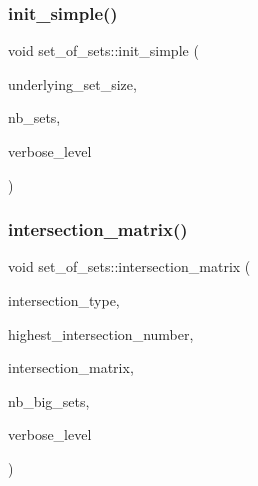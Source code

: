 \mbox{\label{classset__of__sets_a0c90576a42f3cf82abb307fa8dd97162}} 
\subsubsection{\texorpdfstring{init\+\_\+simple()}{init\_simple()}}
{\footnotesize\ttfamily void set\+\_\+of\+\_\+sets\+::init\+\_\+simple (\begin{DoxyParamCaption}\item[{\mbox{\hyperlink{galois_8h_a09fddde158a3a20bd2dcadb609de11dc}{I\+NT}}}]{underlying\+\_\+set\+\_\+size,  }\item[{\mbox{\hyperlink{galois_8h_a09fddde158a3a20bd2dcadb609de11dc}{I\+NT}}}]{nb\+\_\+sets,  }\item[{\mbox{\hyperlink{galois_8h_a09fddde158a3a20bd2dcadb609de11dc}{I\+NT}}}]{verbose\+\_\+level }\end{DoxyParamCaption})}

\mbox{\label{classset__of__sets_ad9f9417382b24bd910d1f3bb203f1431}} 
\subsubsection{\texorpdfstring{intersection\+\_\+matrix()}{intersection\_matrix()}}
{\footnotesize\ttfamily void set\+\_\+of\+\_\+sets\+::intersection\+\_\+matrix (\begin{DoxyParamCaption}\item[{\mbox{\hyperlink{galois_8h_a09fddde158a3a20bd2dcadb609de11dc}{I\+NT}} $\ast$\&}]{intersection\+\_\+type,  }\item[{\mbox{\hyperlink{galois_8h_a09fddde158a3a20bd2dcadb609de11dc}{I\+NT}} \&}]{highest\+\_\+intersection\+\_\+number,  }\item[{\mbox{\hyperlink{galois_8h_a09fddde158a3a20bd2dcadb609de11dc}{I\+NT}} $\ast$\&}]{intersection\+\_\+matrix,  }\item[{\mbox{\hyperlink{galois_8h_a09fddde158a3a20bd2dcadb609de11dc}{I\+NT}} \&}]{nb\+\_\+big\+\_\+sets,  }\item[{\mbox{\hyperlink{galois_8h_a09fddde158a3a20bd2dcadb609de11dc}{I\+NT}}}]{verbose\+\_\+level }\end{DoxyParamCaption})}

